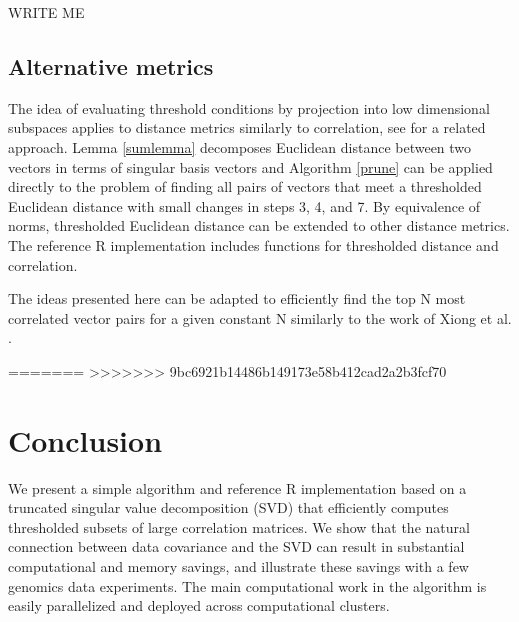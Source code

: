 \documentclass{article}
\let\proglang=\textsf
\numberwithin{algorithmctr}{section}
\begin{document}
WRITE ME

\subsection{Alternative metrics}

The idea of evaluating threshold conditions by projection into low dimensional
subspaces applies to distance metrics similarly to correlation, see
\cite{svd-similarity} for a related approach. Lemma \ref{sumlemma} decomposes
Euclidean distance between two vectors in terms of singular basis vectors and
Algorithm \ref{prune} can be applied directly to the problem of finding all
pairs of vectors that meet a thresholded Euclidean distance with small changes
in steps 3, 4, and 7.  By equivalence of norms, thresholded Euclidean distance
can be extended to other distance metrics. The reference \proglang{R}
implementation \cite{sup} includes functions for thresholded distance and
correlation.

The ideas presented here can be adapted to efficiently find the top N most
correlated vector pairs for a given constant N similarly to the work of
Xiong et al. \cite{prune2}.


=======
>>>>>>> 9bc6921b14486b149173e58b412cad2a2b3fcf70
\section{Conclusion}\label{conclusion}

We present a simple algorithm and reference \proglang{R} implementation based
on a truncated singular value decomposition (SVD) that efficiently computes
thresholded subsets of large correlation  matrices.  We show that the natural
connection between data covariance and the SVD can result in substantial
computational and memory savings, and illustrate these savings with a few
genomics data experiments.  The main computational work in the algorithm is
easily parallelized and deployed across computational clusters.

{}

\end{document}
